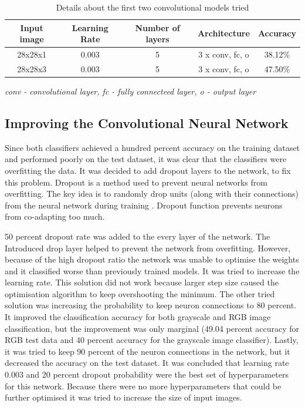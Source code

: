 \begin{table}[h]
\begin{center}
\begin{tabular}{ |c|c|c|c|c| }
\hline
 Input image&Learning Rate &   Number of layers & Architecture & Accuracy \\   \hline
28x28x1 & 0.003   &   5  &  3 x conv, fc, o  & 38.12\% \\
28x28x3 & 0.003   &   5  &  3 x conv, fc, o  & 47.50\% \\
 \hline
\end{tabular}
\caption{Details about the first two convolutional models tried}

\label{table:convi}
\textit{ conv - convolutional layer, fc - fully connecteed layer, o - output layer}
\end{center}
\end{table}

\subsection{Improving the Convolutional Neural Network}

Since both classifiers achieved a hundred percent accuracy on the training dataset and performed poorly on the test dataset, it was clear that the classifiers were overfitting the data. It was decided to add dropout layers to the network, to fix this problem. Dropout is a method used to prevent neural networks from overfitting. The key idea is to randomly drop units (along with their connections) from the neural network during training \cite{dropout}. Dropout function prevents neurons from co-adapting too much. 

50 percent dropout rate was added to the every layer of the network. The Introduced drop layer helped to prevent the network from overfitting. However, because of the high dropout ratio the network was unable to optimise the weights and it classified worse than previously trained models. It was tried to increase the learning rate. This solution did not work because larger step size caused the optimisation algorithm to keep overshooting the minimum. The other tried solution was increasing the probability to keep neuron connections to 80 percent. It improved the classification accuracy for both grayscale and RGB image classification, but the improvement was only marginal (49.04 percent accuracy for RGB test data and 40 percent accuracy for the grayscale image classifier). Lastly, it was tried to keep 90 percent of the neuron connections in the network, but it decreased the accuracy on the test dataset. It was concluded that learning rate 0.003 and 20 percent dropout probability were the best set of hyperparameters for this network. Because there were no more hyperparameters that could be further optimised it was tried to increase the size of input images.


